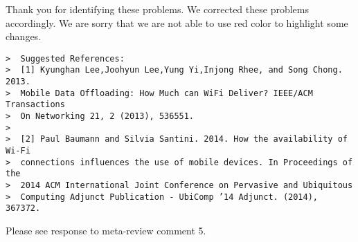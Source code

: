 Thank you for identifying these problems. 
We corrected these problems accordingly. 
We are sorry that we are not able to use red color to highlight some changes.

\begin{verbatim}
>  Suggested References:
>  [1] Kyunghan Lee,Joohyun Lee,Yung Yi,Injong Rhee, and Song Chong. 2013.
>  Mobile Data Offloading: How Much can WiFi Deliver? IEEE/ACM Transactions
>  On Networking 21, 2 (2013), 536551.
>
>  [2] Paul Baumann and Silvia Santini. 2014. How the availability of Wi-Fi
>  connections influences the use of mobile devices. In Proceedings of the
>  2014 ACM International Joint Conference on Pervasive and Ubiquitous
>  Computing Adjunct Publication - UbiComp ’14 Adjunct. (2014), 367372.
\end{verbatim}

Please see response to meta-review comment 5.
